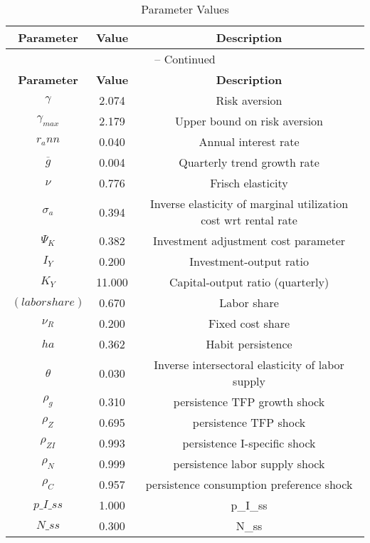\begin{center}
\begin{longtable}{ccc}
\caption{Parameter Values}\\%
\toprule%
\multicolumn{1}{c}{\textbf{Parameter}} &
\multicolumn{1}{c}{\textbf{Value}} &
 \multicolumn{1}{c}{\textbf{Description}}\\%
\midrule%
\endfirsthead
\multicolumn{3}{c}{{\tablename} \thetable{} -- Continued}\\%
\midrule%
\multicolumn{1}{c}{\textbf{Parameter}} &
\multicolumn{1}{c}{\textbf{Value}} &
  \multicolumn{1}{c}{\textbf{Description}}\\%
\midrule%
\endhead
${\gamma}$ 	 & 	 2.074 	 & 	 Risk aversion\\
${\gamma_{max}}$ 	 & 	 2.179 	 & 	 Upper bound on risk aversion\\
${r_ann}$ 	 & 	 0.040 	 & 	 Annual interest rate\\
${\overline{g}}$ 	 & 	 0.004 	 & 	 Quarterly trend growth rate\\
$\nu$ 	 & 	 0.776 	 & 	 Frisch elasticity\\
${\sigma_a}$ 	 & 	 0.394 	 & 	 Inverse elasticity of marginal utilization cost wrt rental rate\\
${\Psi_K}$ 	 & 	 0.382 	 & 	 Investment adjustment cost parameter\\
${I_Y}$ 	 & 	 0.200 	 & 	 Investment-output ratio\\
${K_Y}$ 	 & 	 11.000 	 & 	 Capital-output ratio (quarterly)\\
$(labor share)$ 	 & 	 0.670 	 & 	 Labor share\\
${\nu_R}$ 	 & 	 0.200 	 & 	 Fixed cost share\\
${ha}$ 	 & 	 0.362 	 & 	 Habit persistence\\
${\theta}$ 	 & 	 0.030 	 & 	 Inverse intersectoral elasticity of labor supply\\
${\rho_g}$ 	 & 	 0.310 	 & 	 persistence TFP growth shock\\
${\rho_Z}$ 	 & 	 0.695 	 & 	 persistence TFP shock\\
${\rho_{ZI}}$ 	 & 	 0.993 	 & 	 persistence I-specific shock\\
${\rho_N}$ 	 & 	 0.999 	 & 	 persistence labor supply shock\\
${\rho_C}$ 	 & 	 0.957 	 & 	 persistence consumption preference shock\\
$p\_I\_ss$ 	 & 	 1.000 	 & 	 p\_I\_ss\\
$N\_ss$ 	 & 	 0.300 	 & 	 N\_ss\\
\bottomrule%
\end{longtable}
\end{center}
